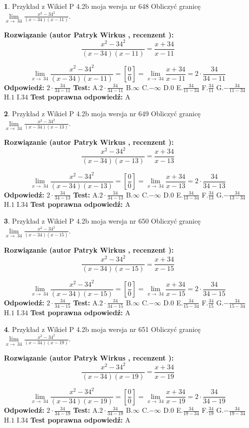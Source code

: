 \documentclass[12pt, a4paper]{article}
\theoremstyle{definition} %
\newtheorem{zad}{}
\newcommand{\zadStart}[1]{\begin{zad}#1\newline}
\newcommand{\zadStop}{\end{zad}}
\newcommand{\rozwStart}[2]{\noindent \textbf{Rozwiązanie (autor #1 , recenzent #2): }\newline}
\newcommand{\rozwStop}{\newline}
\newcommand{\odpStart}{\noindent \textbf{Odpowiedź:}\newline}
\newcommand{\odpStop}{\newline}
\newcommand{\testStart}{\noindent \textbf{Test:}\newline}
\newcommand{\testStop}{\newline}
\newcommand{\kluczStart}{\noindent \textbf{Test poprawna odpowiedź:}\newline}
\newcommand{\kluczStop}{\newline}
\begin{document}
\zadStart{Przykład z Wikieł P 4.2b moja wersja nr 648}
Obliczyć granicę $\lim\limits_{x\to\ 34}\frac{x^{2}-34^{2}}{(x-34)(x-11)}$.
\zadStop
\rozwStart{Patryk Wirkus}{}
$$\frac{x^{2}-34^{2}}{(x-34)(x-11)}=\frac{x+34}{x-11}$$

$$\lim\limits_{x\to\ 34}\frac{x^{2}-34^{2}}{(x-34)(x-11)}=[\frac{0}{0}]=\lim\limits_{x\to\ 34}\frac{x+34}{x-11}=2 \cdot \frac{34}{34-11}$$
\rozwStop
\odpStart
$2 \cdot \frac{34}{34-11}$
\odpStop
\testStart
A.$2 \cdot \frac{34}{34-11}$
B.$\infty$
C.$-\infty$
D.$0$
E.$\frac{34}{11-34}$
F.$\frac{34}{11}$
G.$-\frac{34}{11-34}$
H.$1$
I.$34$
\testStop
\kluczStart
A
\kluczStop



\zadStart{Przykład z Wikieł P 4.2b moja wersja nr 649}
Obliczyć granicę $\lim\limits_{x\to\ 34}\frac{x^{2}-34^{2}}{(x-34)(x-13)}$.
\zadStop
\rozwStart{Patryk Wirkus}{}
$$\frac{x^{2}-34^{2}}{(x-34)(x-13)}=\frac{x+34}{x-13}$$

$$\lim\limits_{x\to\ 34}\frac{x^{2}-34^{2}}{(x-34)(x-13)}=[\frac{0}{0}]=\lim\limits_{x\to\ 34}\frac{x+34}{x-13}=2 \cdot \frac{34}{34-13}$$
\rozwStop
\odpStart
$2 \cdot \frac{34}{34-13}$
\odpStop
\testStart
A.$2 \cdot \frac{34}{34-13}$
B.$\infty$
C.$-\infty$
D.$0$
E.$\frac{34}{13-34}$
F.$\frac{34}{13}$
G.$-\frac{34}{13-34}$
H.$1$
I.$34$
\testStop
\kluczStart
A
\kluczStop



\zadStart{Przykład z Wikieł P 4.2b moja wersja nr 650}
Obliczyć granicę $\lim\limits_{x\to\ 34}\frac{x^{2}-34^{2}}{(x-34)(x-15)}$.
\zadStop
\rozwStart{Patryk Wirkus}{}
$$\frac{x^{2}-34^{2}}{(x-34)(x-15)}=\frac{x+34}{x-15}$$

$$\lim\limits_{x\to\ 34}\frac{x^{2}-34^{2}}{(x-34)(x-15)}=[\frac{0}{0}]=\lim\limits_{x\to\ 34}\frac{x+34}{x-15}=2 \cdot \frac{34}{34-15}$$
\rozwStop
\odpStart
$2 \cdot \frac{34}{34-15}$
\odpStop
\testStart
A.$2 \cdot \frac{34}{34-15}$
B.$\infty$
C.$-\infty$
D.$0$
E.$\frac{34}{15-34}$
F.$\frac{34}{15}$
G.$-\frac{34}{15-34}$
H.$1$
I.$34$
\testStop
\kluczStart
A
\kluczStop



\zadStart{Przykład z Wikieł P 4.2b moja wersja nr 651}
Obliczyć granicę $\lim\limits_{x\to\ 34}\frac{x^{2}-34^{2}}{(x-34)(x-19)}$.
\zadStop
\rozwStart{Patryk Wirkus}{}
$$\frac{x^{2}-34^{2}}{(x-34)(x-19)}=\frac{x+34}{x-19}$$

$$\lim\limits_{x\to\ 34}\frac{x^{2}-34^{2}}{(x-34)(x-19)}=[\frac{0}{0}]=\lim\limits_{x\to\ 34}\frac{x+34}{x-19}=2 \cdot \frac{34}{34-19}$$
\rozwStop
\odpStart
$2 \cdot \frac{34}{34-19}$
\odpStop
\testStart
A.$2 \cdot \frac{34}{34-19}$
B.$\infty$
C.$-\infty$
D.$0$
E.$\frac{34}{19-34}$
F.$\frac{34}{19}$
G.$-\frac{34}{19-34}$
H.$1$
I.$34$
\testStop
\kluczStart
A
\kluczStop
\end{document}
